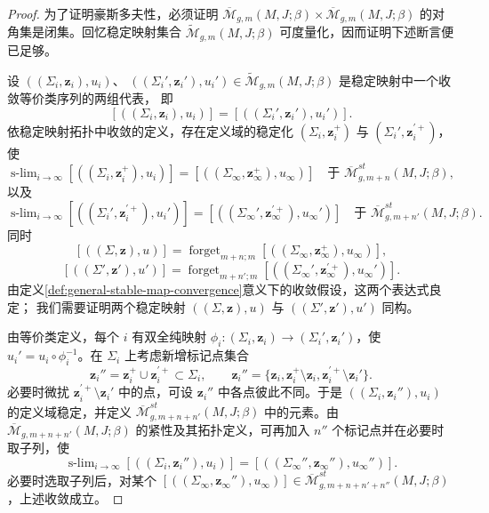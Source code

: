 \begin{proof}
为了证明豪斯多夫性，必须证明
$\overline{\mathcal M}_{g,m}(M,J;\beta)\times
\overline{\mathcal M}_{g,m}(M,J;\beta)$ 的对角集是闭集。回忆稳定映射集合
$\widetilde{\mathcal M}_{g,m}(M,J;\beta)$ 可度量化，因而证明下述断言便已足够。

设 $((\Sigma_i,\boldsymbol z_i),u_i)$、
$((\Sigma_i',\boldsymbol z_i'),u_i')\in
\widetilde{\mathcal M}_{g,m}(M,J;\beta)$ 是稳定映射中一个收敛等价类序列的两组代表，
即
\[
 [((\Sigma_i,\boldsymbol z_i),u_i)]
 =[((\Sigma_i',\boldsymbol z_i'),u_i')].
\]
依稳定映射拓扑中收敛的定义，存在定义域的稳定化
$(\Sigma_i,\boldsymbol z_i^+)$ 与
$(\Sigma_i',\boldsymbol z_i^{\prime+})$，使
\[
 \operatorname{s-lim}_{i\to\infty}[((\Sigma_i,\boldsymbol z_i^+),u_i)]
 =[((\Sigma_\infty,\boldsymbol z_\infty^+),u_\infty)]
 \quad\text{于 }\overline{\mathcal M}_{g,m+n}^{st}(M,J;\beta),
\]
以及
\[
 \operatorname{s-lim}_{i\to\infty}
 [((\Sigma_i',\boldsymbol z_i^{\prime+}),u_i')]
 =[((\Sigma_\infty',\boldsymbol z_\infty^{\prime+}),u_\infty')]
 \quad\text{于 }\overline{\mathcal M}_{g,m+n'}^{st}(M,J;\beta).
\]
同时
\[
 [((\Sigma,\boldsymbol z),u)]
 =\operatorname{forget}_{m+n;m}
 [((\Sigma_\infty,\boldsymbol z_\infty^+),u_\infty)],
\]
\[
 [((\Sigma',\boldsymbol z'),u')]
 =\operatorname{forget}_{m+n';m}
 [((\Sigma_\infty',\boldsymbol z_\infty^{\prime+}),u_\infty')].
\]
由定义\ref{def:general-stable-map-convergence}意义下的收敛假设，这两个表达式良定；
我们需要证明两个稳定映射 $((\Sigma,\boldsymbol z),u)$ 与
$((\Sigma',\boldsymbol z'),u')$ 同构。

由等价类定义，每个 $i$ 有双全纯映射
$\phi_i:(\Sigma_i,\boldsymbol z_i)\to(\Sigma_i',\boldsymbol z_i')$，使
$u_i'=u_i\circ\phi_i^{-1}$。在 $\Sigma_i$ 上考虑新增标记点集合
\[
 \boldsymbol z_i''=\boldsymbol z_i^+\cup\boldsymbol z_i^{\prime+}\subset\Sigma_i,
 \qquad
 \boldsymbol z_i''=\{\boldsymbol z_i,
 \boldsymbol z_i^+\setminus\boldsymbol z_i,
 \boldsymbol z_i^{\prime+}\setminus\boldsymbol z_i'\}.
\]
必要时微扰 $\boldsymbol z_i^{\prime+}\setminus\boldsymbol z_i'$ 中的点，可设
$\boldsymbol z_i''$ 中各点彼此不同。于是
$((\Sigma_i,\boldsymbol z_i''),u_i)$ 的定义域稳定，并定义
$\overline{\mathcal M}_{g,m+n+n'}^{st}(M,J;\beta)$ 中的元素。由
$\overline{\mathcal M}_{g,m+n+n'}(M,J;\beta)$ 的紧性及其拓扑定义，可再加入
$n''$ 个标记点并在必要时取子列，使
\begin{equation}
 \operatorname{s-lim}_{i\to\infty}
 [((\Sigma_i,\boldsymbol z_i''),u_i)]
 =[((\Sigma_\infty'',\boldsymbol z_\infty''),u_\infty'')].
 \label{eq:common-stabilization-limit}
\end{equation}
必要时选取子列后，对某个
$[((\Sigma_\infty,\boldsymbol z_\infty''),u_\infty)]
\in\overline{\mathcal M}_{g,m+n+n'+n''}^{st}(M,J;\beta)$，上述收敛成立。


\end{proof}
